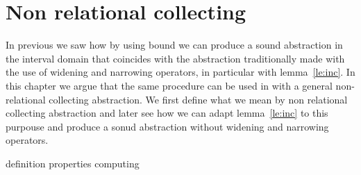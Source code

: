 \chapter{Non relational collecting}

In previous we saw how by using bound we can produce a sound
abstraction in the interval domain that coincides with the abstraction
traditionally made with the use of widening and narrowing operators,
in particular with lemma~\ref{le:inc}. In this chapter we argue that
the same procedure can be used in with a general non-relational
collecting abstraction. We first define what we mean by non relational
collecting abstraction and later see how we can adapt
lemma~\ref{le:inc} to this purpouse and produce a sonud abstraction
without widening and narrowing operators.

{definition}
{properties}
{computing}
